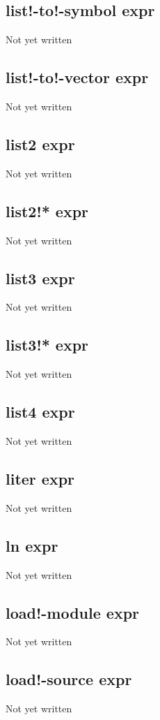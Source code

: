 \documentclass[a4paper,11pt]{article}
\begin{document}
\subsection{\ttfamily list!-to!-symbol expr}
Not yet written

\subsection{\ttfamily list!-to!-vector expr}
Not yet written

\subsection{\ttfamily list2 expr}
Not yet written

\subsection{\ttfamily list2!* expr}
Not yet written

\subsection{\ttfamily list3 expr}
Not yet written

\subsection{\ttfamily list3!* expr}
Not yet written

\subsection{\ttfamily list4 expr}
Not yet written

\subsection{\ttfamily liter expr}
Not yet written

\subsection{\ttfamily ln expr}
Not yet written

\subsection{\ttfamily load!-module expr}
Not yet written

\subsection{\ttfamily load!-source expr}
Not yet written
\end{document}
